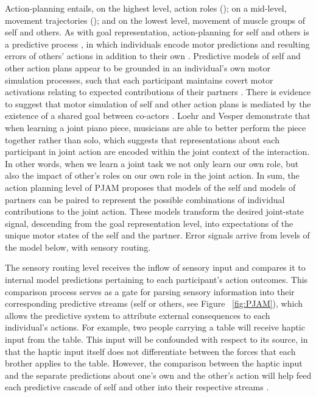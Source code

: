 \begin{CJK}{UTF8}{gbsn}
Action-planning entails, on the highest level, action roles (); on a mid-level, movement trajectories (); and on the lowest level, movement of muscle groups of self and others.  As with goal representation, action-planning for self and others is a predictive process \citep{Flanagan2003}, in which individuals encode motor predictions and resulting errors of others' actions in addition to their own \citep{VanSchie2004,Radke2011}.  Predictive models of self and other action plans appear to be grounded in an individual's own motor simulation processes, such that each participant maintains covert motor activations relating to expected contributions of their partners \citep{Hollander2012}.  There is evidence to suggest that motor simulation of self and other action plans is mediated by the existence of a shared goal between co-actors \citep{Kourtis2010}.  Loehr and Vesper \textcite{Loehr2016} demonstrate that when learning a joint piano piece, musicians are able to better perform the piece together rather than solo, which suggests that representations about each participant in joint action are encoded within the joint context of the interaction.  In other words, when we learn a joint task we not only learn our own role, but also the impact of other's roles on our own role in the joint action.  In sum, the action planning level of PJAM proposes that models of the self and models of partners can be paired to represent the possible combinations of individual contributions to the joint action. These models transform the desired joint-state signal, descending from the goal representation level, into expectations of the unique motor states of the self and the partner.  Error signals arrive from levels of the model below, with sensory routing.

The sensory routing level receives the inflow of sensory input and compares it to internal model predictions pertaining to each participant's action outcomes.  This comparison process serves as a gate for parsing sensory information into their corresponding predictive streams (self or others, see Figure ~\ref{fig:PJAM}), which allows the predictive system to attribute external consequences to each individual’s actions.   For example, two people carrying a table will receive haptic input from the table. This input will be confounded with respect to its source, in that the haptic input itself does not differentiate between the forces that each brother applies to the table. However, the comparison between the haptic input and the separate predictions about one’s own and the other’s action will help feed each predictive cascade of self and other into their respective streams \citep{Pesquita2017}.


\end{CJK}
